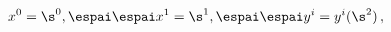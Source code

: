 \begin{equation} \label{embed}
x^0=\s^0, \espai\espai x^1=\s^1, \espai \espai y^i=y^i(\s^2)\,,
\end{equation}

